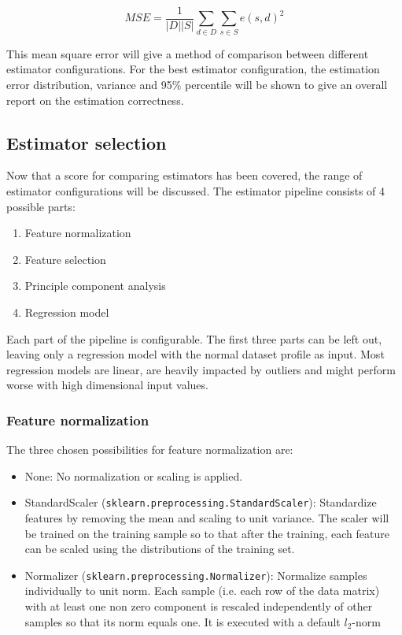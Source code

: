 \begin{equation}
	MSE = \frac{1}{|D||S|} \sum_{d \in D} \sum_{s \in S} e(s, d)^2
\end{equation}

This mean square error will give a method of comparison between different estimator configurations. For the best estimator configuration, the estimation error distribution, variance and 95\% percentile will be shown to give an overall report on the estimation correctness.

\subsection{Estimator selection}
\label{subsec:estimatorselection}
Now that a score for comparing estimators has been covered, the range of estimator configurations will be discussed.
The estimator pipeline consists of 4 possible parts:
\begin{enumerate}
	\item Feature normalization
	\item Feature selection
	\item Principle component analysis
	\item Regression model
\end{enumerate}

Each part of the pipeline is configurable. The first three parts can be left out, leaving only a regression model with the normal dataset profile as input. Most regression models are linear, are heavily impacted by outliers and might perform worse with high dimensional input values. 

\subsubsection{Feature normalization}
The three chosen possibilities for feature normalization are:
\begin{itemize}
	\item None: No normalization or scaling is applied.
	\item StandardScaler (\verb|sklearn.preprocessing.StandardScaler|): Standardize features by removing the mean and scaling to unit variance. The scaler will be trained on the training sample so to that after the training, each feature can be scaled using the distributions of the training set.
	\item Normalizer (\verb|sklearn.preprocessing.Normalizer|): Normalize samples individually to unit norm. Each sample (i.e. each row of the data matrix) with at least one non zero component is rescaled independently of other samples so that its norm equals one. It is executed with a default $l_2$-norm
\end{itemize}

